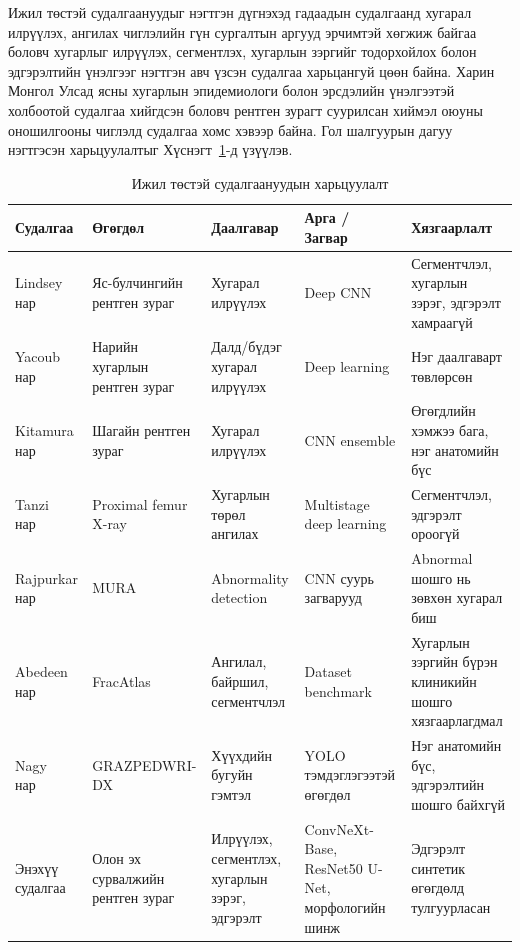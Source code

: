Ижил төстэй судалгаануудыг нэгтгэн дүгнэхэд гадаадын судалгаанд хугарал илрүүлэх, ангилах чиглэлийн гүн сургалтын аргууд эрчимтэй хөгжиж байгаа боловч хугарлыг илрүүлэх, сегментлэх, хугарлын зэргийг тодорхойлох болон эдгэрэлтийн үнэлгээг нэгтгэн авч үзсэн судалгаа харьцангуй цөөн байна. Харин Монгол Улсад ясны хугарлын эпидемиологи болон эрсдэлийн үнэлгээтэй холбоотой судалгаа хийгдсэн боловч рентген зурагт суурилсан хиймэл оюуны оношилгооны чиглэлд судалгаа хомс хэвээр байна. Гол шалгуурын дагуу нэгтгэсэн харьцуулалтыг Хүснэгт~\ref{tab:lit_compare}-д үзүүлэв.

\begin{table}[H]
    \centering
    \caption{Ижил төстэй судалгаануудын харьцуулалт}
    \label{tab:lit_compare}
    \small
    \begin{tabular}{p{2.7cm} p{2.6cm} p{2.7cm} p{2.7cm} p{3.0cm}}
    \toprule
    \textbf{Судалгаа} & \textbf{Өгөгдөл} & \textbf{Даалгавар} & \textbf{Арга / Загвар} & \textbf{Хязгаарлалт} \\
    \midrule
    Lindsey нар~\cite{ref08} & Яс-булчингийн рентген зураг & Хугарал илрүүлэх & Deep CNN & Сегментчлэл, хугарлын зэрэг, эдгэрэлт хамраагүй \\[4pt]
    Yacoub нар~\cite{ref10} & Нарийн хугарлын рентген зураг & Далд/бүдэг хугарал илрүүлэх & Deep learning & Нэг даалгаварт төвлөрсөн \\[4pt]
    Kitamura нар~\cite{ref14} & Шагайн рентген зураг & Хугарал илрүүлэх & CNN ensemble & Өгөгдлийн хэмжээ бага, нэг анатомийн бүс \\[4pt]
    Tanzi нар~\cite{ref15} & Proximal femur X-ray & Хугарлын төрөл ангилах & Multistage deep learning & Сегментчлэл, эдгэрэлт ороогүй \\[4pt]
    Rajpurkar нар~\cite{ref39} & MURA & Abnormality detection & CNN суурь загварууд & Abnormal шошго нь зөвхөн хугарал биш \\[4pt]
    Abedeen нар~\cite{ref40} & FracAtlas & Ангилал, байршил, сегментчлэл & Dataset benchmark & Хугарлын зэргийн бүрэн клиникийн шошго хязгаарлагдмал \\[4pt]
    Nagy нар~\cite{ref41} & GRAZPEDWRI-DX & Хүүхдийн бугуйн гэмтэл & YOLO тэмдэглэгээтэй өгөгдөл & Нэг анатомийн бүс, эдгэрэлтийн шошго байхгүй \\[4pt]
    Энэхүү судалгаа & Олон эх сурвалжийн рентген зураг & Илрүүлэх, сегментлэх, хугарлын зэрэг, эдгэрэлт & ConvNeXt-Base, ResNet50 U-Net, морфологийн шинж & Эдгэрэлт синтетик өгөгдөлд тулгуурласан \\
    \bottomrule
    \end{tabular}
\end{table}

